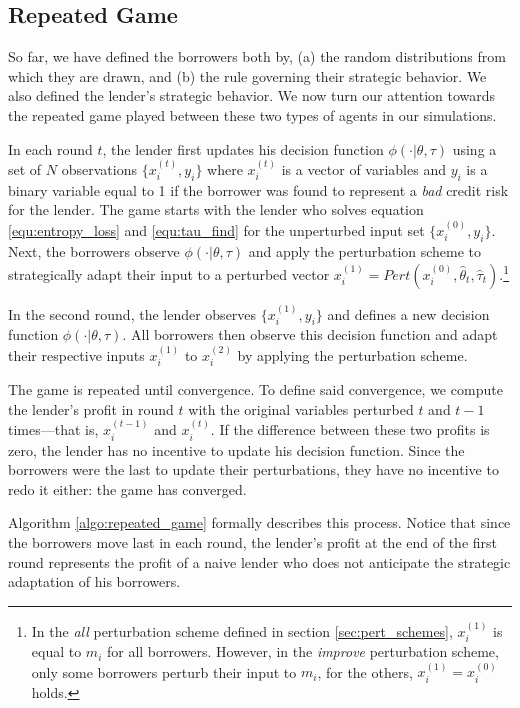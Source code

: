\documentclass[12pt]{article} %
\begin{document}
\subsection{Repeated Game}
So far, we have defined the borrowers both by, (a) the random distributions from which they are drawn, and (b) the rule governing their strategic behavior. We also defined the lender's strategic behavior. We now turn our attention towards the repeated game played between these two types of agents in our simulations. 

In each round $t$, the lender first updates his decision function $\phi(\cdot|\theta,\tau)$ using a set of $N$ observations $\{x_i^{(t)},y_i\}$ where $x_i^{(t)}$ is a vector of variables and $y_i$ is a binary variable equal to 1 if the borrower was found to represent a \textit{bad} credit risk for the lender. 
The game starts with the lender who solves equation \eqref{equ:entropy_loss} and \eqref{equ:tau_find} for the unperturbed input set $\{x_i^{(0)},y_i\}$.
Next, the borrowers observe $\phi(\cdot|\theta,\tau)$ and apply the perturbation scheme to strategically adapt their input to a perturbed vector $x_i^{(1)} = Pert(x_i^{(0)},\hat{\theta}_t, \hat{\tau}_t)$.\footnote{
In the \textit{all} perturbation scheme defined in section \ref{sec:pert_schemes}, $x_i^{(1)}$ is equal to $m_i$ for all borrowers. However, in the \textit{improve} perturbation scheme, only some borrowers perturb their input to $m_i$, for the others, $x_i^{(1)} = x_i^{(0)}$ holds.
} 

In the second round, the lender observes $\{x_i^{(1)},y_i\}$ and defines a new decision function $\phi(\cdot|\theta,\tau)$. All borrowers then observe this decision function and adapt their respective inputs $x_i^{(1)}$ to $x_i^{(2)}$ by applying the perturbation scheme. 

The game is repeated until convergence. To define said convergence, we compute the lender's profit in round $t$ with the original variables perturbed $t$ and $t-1$ times---that is, $x_i^{(t-1)}$ and $x_i^{(t)}$. If the difference between these two profits is zero, the lender has no incentive to update his decision function. Since the borrowers were the last to update their perturbations, they have no incentive to redo it either: the game has converged. 

Algorithm  \eqref{algo:repeated_game} formally describes this process. 
Notice that since the borrowers move last in each round, the lender's profit at the end of the first round represents the profit of a naive lender who does not anticipate the strategic adaptation of his borrowers. 
\end{document}
